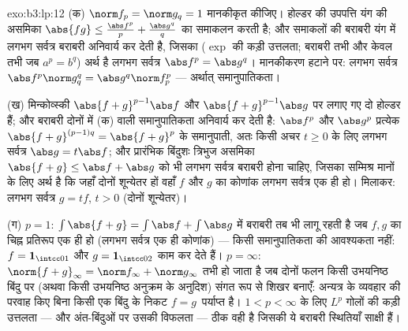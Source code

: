\begin{solution}{exo:b3:lp:12}
(क) $\norm f_p = \norm g_q = 1$ मानकीकृत कीजिए। होल्डर की उपपत्ति यंग की असमिका $\abs{fg} \leq
\frac{\abs f^p}p + \frac{\abs g^q}q$ का
समाकलन करती है; और समाकलों की बराबरी यंग में लगभग सर्वत्र बराबरी
अनिवार्य कर देती है, जिसका ($\exp$ की कड़ी उत्तलता; बराबरी तभी और
केवल तभी जब $a^p = b^q$) अर्थ है लगभग सर्वत्र $\abs
f^p = \abs g^q$। मानकीकरण हटाने पर:
लगभग सर्वत्र $\abs f^p\norm g_q^q = \abs g^q\norm f_p^p$ --- अर्थात् समानुपातिकता।

(ख) मिन्कोव्स्की $\abs{f + g}^{p-1}
\abs f$ और $\abs{f+g}^{p-1}\abs g$ पर लगाए गए दो होल्डर हैं; और बराबरी
दोनों में (क) वाली समानुपातिकता अनिवार्य कर देती है: $\abs f^p$ और $\abs g^p$
प्रत्येक $\abs{f+g}^{(p-1)q} = \abs{f+g}^p$ के समानुपाती, अतः किसी अचर $t \geq 0$ के लिए लगभग सर्वत्र
$\abs g = t\abs f$; और प्रारंभिक बिंदुशः त्रिभुज असमिका $\abs{f + g} \leq
\abs f + \abs g$ को भी लगभग सर्वत्र
बराबरी होना चाहिए, जिसका सम्मिश्र मानों के लिए अर्थ है कि जहाँ दोनों
शून्येतर हों वहाँ $f$ और $g$ का कोणांक लगभग सर्वत्र एक ही हो।
मिलाकर: लगभग सर्वत्र $g = tf$, $t > 0$ (दोनों शून्येतर)।

(ग) $p = 1$: $\int\abs{f + g} = \int\abs f +
\int\abs g$ में बराबरी तब भी लागू रहती है जब $f, g$ का चिह्न
प्रतिरूप एक ही हो (लगभग सर्वत्र एक ही कोणांक) --- किसी समानुपातिकता
की आवश्यकता नहीं: $f = \mathbf 1_{\intcc01}$ और $g = \mathbf 1_{\intcc02}$ काम कर देते हैं। $p = \infty$: $\norm{f+g}_\infty = \norm f_\infty +
\norm g_\infty$ तभी
हो जाता है जब दोनों फलन किसी उभयनिष्ठ बिंदु पर (अथवा किसी उभयनिष्ठ
अनुक्रम के अनुदिश) संगत रूप से शिखर बनाएँ: अन्यत्र के व्यवहार की
परवाह किए बिना किसी एक बिंदु के निकट $f = g\,$ पर्याप्त है। $1 <
p < \infty$ के
लिए $L^p$ गोलों की कड़ी उत्तलता --- और अंत-बिंदुओं पर उसकी विफलता
--- ठीक वही है जिसकी ये बराबरी स्थितियाँ साक्षी हैं।
\end{solution}

